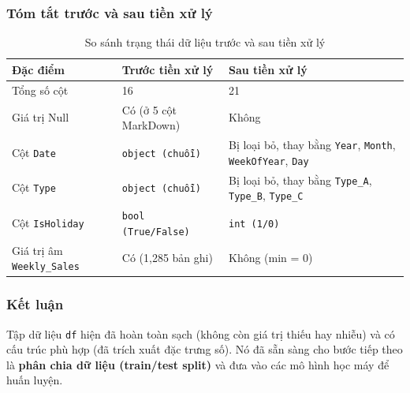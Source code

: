 \subsubsection{Tóm tắt trước và sau tiền xử lý}

\begin{table}[H]
\centering
\caption{So sánh trạng thái dữ liệu trước và sau tiền xử lý}
\begin{tabularx}{\textwidth}{|p{3cm}|X|X|}
\hline
\textbf{Đặc điểm} & \textbf{Trước tiền xử lý} & \textbf{Sau tiền xử lý} \\ \hline
Tổng số cột & 16 & 21 \\ \hline
Giá trị Null & Có (ở 5 cột MarkDown) & Không \\ \hline
Cột \texttt{Date} & \texttt{object (chuỗi)} & Bị loại bỏ, thay bằng \texttt{Year}, \texttt{Month}, \texttt{WeekOfYear}, \texttt{Day} \\ \hline
Cột \texttt{Type} & \texttt{object (chuỗi)} & Bị loại bỏ, thay bằng \texttt{Type\_A}, \texttt{Type\_B}, \texttt{Type\_C} \\ \hline
Cột \texttt{IsHoliday} & \texttt{bool (True/False)} & \texttt{int (1/0)} \\ \hline
Giá trị âm \texttt{Weekly\_Sales} & Có (1,285 bản ghi) & Không (min = 0) \\ \hline
\end{tabularx}
\end{table}

\subsubsection{Kết luận}

Tập dữ liệu \texttt{df} hiện đã hoàn toàn sạch (không còn giá trị thiếu hay nhiễu) và có cấu trúc phù hợp (đã trích xuất đặc trưng số). Nó đã sẵn sàng cho bước tiếp theo là \textbf{phân chia dữ liệu (train/test split)} và đưa vào các mô hình học máy để huấn luyện.
